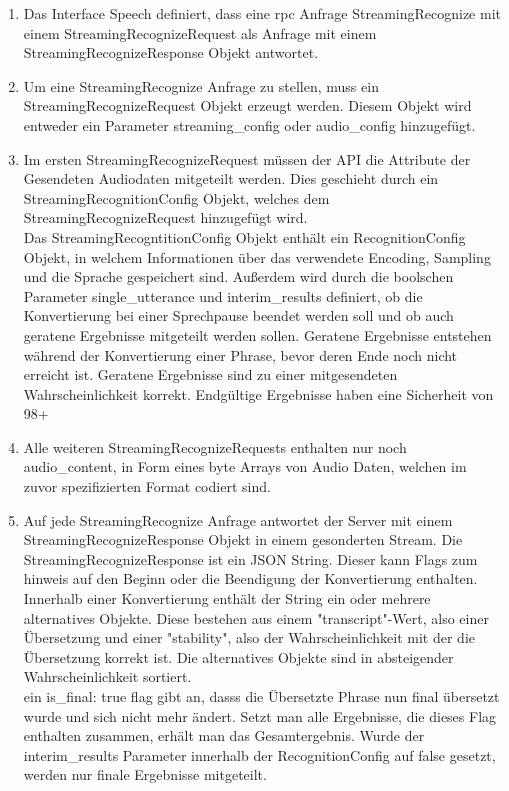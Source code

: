 \begin{enumerate}
	\item Das Interface Speech definiert, dass eine rpc Anfrage StreamingRecognize mit einem StreamingRecognizeRequest als Anfrage mit einem StreamingRecognizeResponse Objekt antwortet.
	\item Um eine StreamingRecognize Anfrage zu stellen, muss ein StreamingRecognizeRequest Objekt erzeugt werden. Diesem Objekt wird entweder ein Parameter streaming\_config oder audio\_config hinzugefügt.
	\item Im ersten StreamingRecognizeRequest müssen der API die Attribute der Gesendeten Audiodaten mitgeteilt werden. Dies geschieht durch ein StreamingRecognitionConfig Objekt, welches dem StreamingRecognizeRequest hinzugefügt wird.\\
	Das StreamingRecogntitionConfig Objekt enthält ein RecognitionConfig Objekt, in welchem Informationen über das verwendete Encoding, Sampling und die Sprache gespeichert sind. Außerdem wird durch die boolschen Parameter single\_utterance und interim\_results definiert, ob die Konvertierung bei einer Sprechpause beendet werden soll und ob auch geratene Ergebnisse mitgeteilt werden sollen. Geratene Ergebnisse entstehen während der Konvertierung einer Phrase, bevor deren Ende noch nicht erreicht ist. Geratene Ergebnisse sind zu einer mitgesendeten Wahrscheinlichkeit korrekt. Endgültige Ergebnisse haben eine Sicherheit von 98+ %
	\item Alle weiteren StreamingRecognizeRequests enthalten nur noch audio\_content, in Form eines byte Arrays von Audio Daten, welchen im zuvor spezifizierten Format codiert sind.
	\item Auf jede StreamingRecognize Anfrage antwortet der Server mit einem StreamingRecognizeResponse Objekt in einem gesonderten Stream. Die StreamingRecognizeResponse ist ein JSON String. Dieser kann Flags zum hinweis auf den Beginn oder die Beendigung der Konvertierung enthalten. Innerhalb einer Konvertierung enthält der String ein oder mehrere alternatives Objekte. Diese bestehen aus einem "transcript"-Wert, also einer Übersetzung und einer "stability", also der Wahrscheinlichkeit mit der die Übersetzung korrekt ist. Die alternatives Objekte sind in absteigender Wahrscheinlichkeit sortiert.\\
	ein is\_final: true flag gibt an, dasss die Übersetzte Phrase nun final übersetzt wurde und sich nicht mehr ändert. Setzt man alle Ergebnisse, die dieses Flag enthalten zusammen, erhält man das Gesamtergebnis. Wurde der interim\_results Parameter innerhalb der RecognitionConfig auf false gesetzt, werden nur finale Ergebnisse mitgeteilt.
\end{enumerate} \cite{https://cloud.google.com/speech/reference/rpc/google.cloud.speech.v1beta1}

